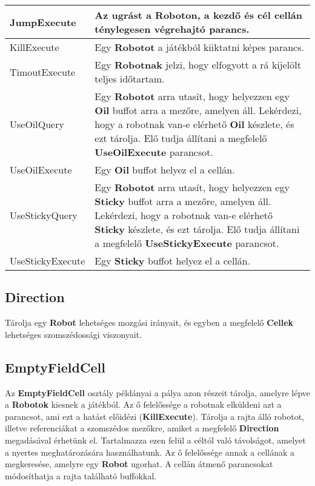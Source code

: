 \begin{tabularx}{\linewidth}{| l | X |}
JumpExecute & Az ugrást a \textbf{Roboton}, a kezdő és cél cellán ténylegesen végrehajtó parancs. \tabularnewline\hline

KillExecute & Egy \textbf{Robotot} a játékból kiiktatni képes parancs. \tabularnewline\hline

TimoutExecute & Egy \textbf{Robotnak} jelzi, hogy elfogyott a rá kijelölt teljes időtartam. \tabularnewline\hline

UseOilQuery & Egy \textbf{Robotot} arra utasít, hogy helyezzen egy \textbf{Oil} buffot arra a mezőre, amelyen áll. Lekérdezi, hogy a robotnak van-e elérhető \textbf{Oil} készlete, és ezt tárolja. Elő tudja állítani a megfelelő \textbf{UseOilExecute} parancsot. \tabularnewline\hline

UseOilExecute & Egy \textbf{Oil} buffot helyez el a cellán. \tabularnewline\hline

UseStickyQuery & Egy \textbf{Robotot} arra utasít, hogy helyezzen egy \textbf{Sticky} buffot arra a mezőre, amelyen áll. Lekérdezi, hogy a robotnak van-e elérhető \textbf{Sticky} készlete, és ezt tárolja. Elő tudja állítani a megfelelő \textbf{UseStickyExecute} parancsot. \tabularnewline\hline

UseStickyExecute & Egy \textbf{Sticky} buffot helyez el a cellán. \tabularnewline\hline
\end{tabularx}

\subsection{Direction}
Tárolja egy \textbf{Robot} lehetséges mozgási irányait, és egyben a megfelelő \textbf{Cellek} lehetséges szomszédossági viszonyait.

\subsection{EmptyFieldCell}
Az \textbf{EmptyFieldCell} osztály példányai a pálya azon részeit tárolja, amelyre lépve a \textbf{Robotok} kiesnek a játékból. Az ő felelőssége a robotnak elküldeni azt a parancsot, ami ezt a hatást előidézi (\textbf{KillExecute}).
Tárolja a rajta álló robotot, illetve referenciákat a szomszédos mezőkre, amiket a megfelelő \textbf{Direction} megadásával érhetünk el. Tartalmazza ezen felül a céltól való távolságot, amelyet a nyertes meghatározására használhatunk. Az ő felelőssége annak a cellának a megkeresése, amelyre egy \textbf{Robot} ugorhat. A cellán átmenő parancsokat módosíthatja a rajta található buffokkal.

